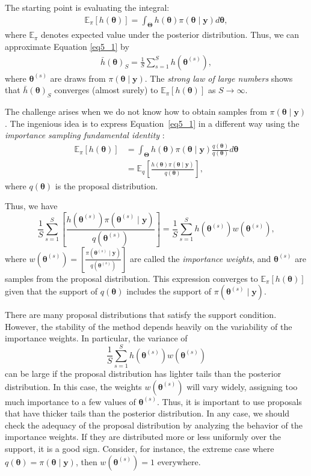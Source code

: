 The starting point is evaluating the integral:
\begin{align}\label{eq5_1}
	\mathbb{E}_{\pi}[h(\bm{\theta})]=\int_{\bm{\Theta}} h(\bm{\theta}) \pi(\bm{\theta}\mid \bm{y})d\bm{\theta},
\end{align}
where $\mathbb{E}_{\pi}$ denotes expected value under the posterior distribution.
Thus, we can approximate Equation \ref{eq5_1} by
\begin{align}\label{eq5_2}
	\bar{h}(\bm{\theta})_S=\frac{1}{S}\sum_{s=1}^S h(\bm{\theta}^{(s)}), 
\end{align}
where $\bm{\theta}^{(s)}$ are draws from $\pi(\bm{\theta}\mid \bm{y})$. The \textit{strong law of large numbers} shows that $\bar{h}(\bm{\theta})_S$ converges (almost surely) to $\mathbb{E}_{\pi}[h(\bm{\theta})]$ as $S \rightarrow \infty$.

The challenge arises when we do not know how to obtain samples from $\pi(\bm{\theta}\mid \bm{y})$. The ingenious idea is to express Equation~\ref{eq5_1} in a different way using the \textit{importance sampling fundamental identity} \cite[Chap.~3]{robert2011monte}:
\begin{align}\label{eq5_3}
	\mathbb{E}_{\pi}[h(\bm{\theta})]&=\int_{\bm{\Theta}} h(\bm{\theta}) \pi(\bm{\theta}\mid \bm{y})\frac{q(\bm{\theta})}{q(\bm{\theta})}d\bm{\theta}\nonumber\\
	&=\mathbb{E}_{q}\left[\frac{h(\bm{\theta})\pi(\bm{\theta}\mid \bm{y})}{q(\bm{\theta})}\right],
\end{align}   
where $q(\bm{\theta})$ is the proposal distribution.

Thus, we have $$\frac{1}{S}\sum_{s=1}^S \left[\frac{h(\bm{\theta}^{(s)})\pi(\bm{\theta}^{(s)}\mid \bm{y})}{q(\bm{\theta}^{(s)})}\right]= \frac{1}{S}\sum_{s=1}^S h(\bm{\theta}^{(s)})w(\bm{\theta}^{(s)}),$$ where $w(\bm{\theta}^{(s)})= \left[\frac{\pi(\bm{\theta}^{(s)}\mid \bm{y})}{q(\bm{\theta}^{(s)})}\right]$ are called the \textit{importance weights}, and $\bm{\theta}^{(s)}$ are samples from the proposal distribution. This expression converges to $\mathbb{E}_{\pi}[h(\bm{\theta})]$ given that the support of $q(\bm{\theta})$ includes the support of $\pi(\bm{\theta}^{(s)}\mid \bm{y})$.

There are many proposal distributions that satisfy the support condition. However, the stability of the method depends heavily on the variability of the importance weights. In particular, the variance of  
\[
\frac{1}{S}\sum_{s=1}^S h(\bm{\theta}^{(s)})w(\bm{\theta}^{(s)})
\]  
can be large if the proposal distribution has lighter tails than the posterior distribution. In this case, the weights \( w(\bm{\theta}^{(s)}) \) will vary widely, assigning too much importance to a few values of \( \bm{\theta}^{(s)} \). Thus, it is important to use proposals that have thicker tails than the posterior distribution. In any case, we should check the adequacy of the proposal distribution by analyzing the behavior of the importance weights. If they are distributed more or less uniformly over the support, it is a good sign. Consider, for instance, the extreme case where $q(\bm{\theta}) = \pi(\bm{\theta}\mid \bm{y})$, then $w(\bm{\theta}^{(s)}) = 1$ everywhere. 

